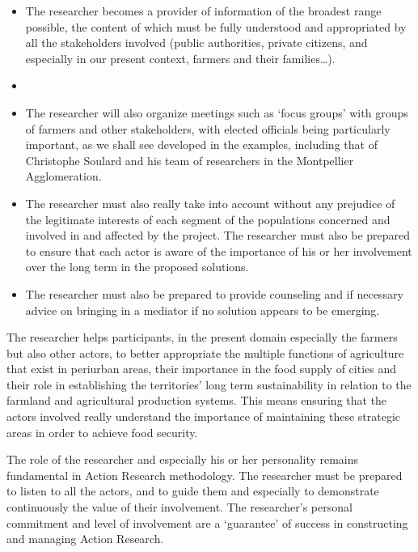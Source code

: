 \documentclass[10pt,a4paper]{article}
\begin{document}
\begin{multicols}{2}
\begin{itemize}[noitemsep,nolistsep]
\item The researcher becomes a provider of information of the broadest range possible, the content of which must be fully understood and appropriated by all the stakeholders involved (public authorities, private citizens, and especially in our present context, farmers and their families\ldots).
\item {}
\item The researcher will also organize meetings such as `focus groups' with groups of farmers and other stakeholders, with elected officials being particularly important, as we shall see developed in the examples, including that of Christophe Soulard and his team of researchers in the Montpellier Agglomeration.
\item The researcher must also really take into account without any prejudice of the legitimate interests of each segment of the populations concerned and involved in and affected by the project. The researcher must also be prepared to ensure that each actor is aware of the importance of his or her involvement over the long term in the proposed solutions.
\item The researcher must also be prepared to provide counseling and if necessary advice on bringing in a mediator if no solution appears to be emerging.
\end{itemize}

The researcher helps participants, in the present domain especially the farmers but also other actors, to better appropriate the multiple functions of agriculture that exist in periurban areas, their importance in the food supply of cities and their role in establishing the territories' long term sustainability in relation to the farmland and agricultural production systems. This means ensuring that the actors involved really understand the importance of maintaining these strategic areas in order to achieve food security.

The role of the researcher and especially his or her personality remains fundamental in Action Research methodology. The researcher must be prepared to listen to all the actors, and to guide them and especially to demonstrate continuously the value of their involvement. The researcher's personal commitment and level of involvement are a `guarantee' of success in constructing and managing Action Research.


\end{multicols}
\end{document}
